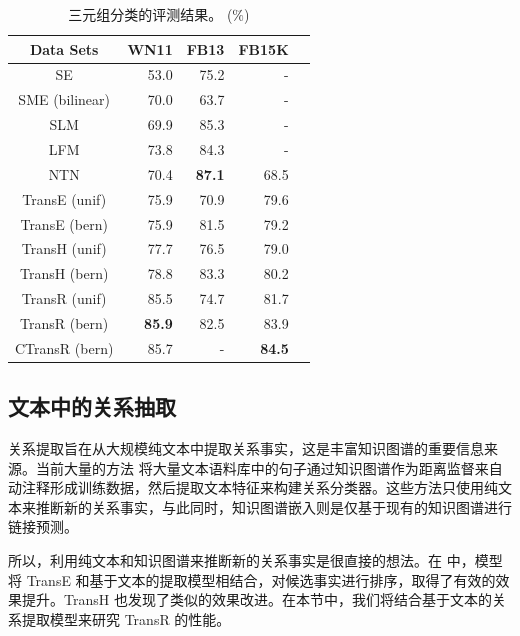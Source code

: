     \begin{table}[htb]
    \small
    \centering
    \caption{三元组分类的评测结果。 ($\%$)}
    \label{label_1:triple_classification}
    \begin{tabular}{|c|r|r|r|r|}
    \hline
    Data Sets & WN11 & FB13 & FB15K \\
    \hline
    SE                   & 53.0 &           75.2  & - \\
    SME (bilinear) & 70.0 &           63.7  & - \\
    SLM                & 69.9 &           85.3  & - \\
    LFM                & 73.8 &           84.3  & - \\
    NTN                & 70.4 &\textbf{87.1} &68.5 \\
    TransE (unif)  & 75.9 &           70.9  & 79.6 \\
    TransE (bern) & 75.9 &           81.5  & 79.2 \\
    TransH (unif)  & 77.7 &           76.5  & 79.0 \\
    TransH (bern) & 78.8 &           83.3  & 80.2 \\ \hline
    TransR (unif)  &85.5  &           74.7  & 81.7 \\
    TransR (bern) &\textbf{85.9}&82.5  & 83.9 \\
    CTransR (bern) & 85.7 & -&\textbf{84.5}\\
    \hline
    \end{tabular}
    \end{table}

    \subsection{文本中的关系抽取}

    关系提取旨在从大规模纯文本中提取关系事实，这是丰富知识图谱的重要信息来源。当前大量的方法 \cite{mintz2009distant,riedel2010modeling,hoffmann2011knowledge,surdeanu2012multi}将大量文本语料库中的句子通过知识图谱作为距离监督来自动注释形成训练数据，然后提取文本特征来构建关系分类器。这些方法只使用纯文本来推断新的关系事实，与此同时，知识图谱嵌入则是仅基于现有的知识图谱进行链接预测。


    所以，利用纯文本和知识图谱来推断新的关系事实是很直接的想法。在 \cite{weston2013connecting} 中，模型将 TransE 和基于文本的提取模型相结合，对候选事实进行排序，取得了有效的效果提升。TransH \cite{wang2014knowledge} 也发现了类似的效果改进。在本节中，我们将结合基于文本的关系提取模型来研究 TransR 的性能。


